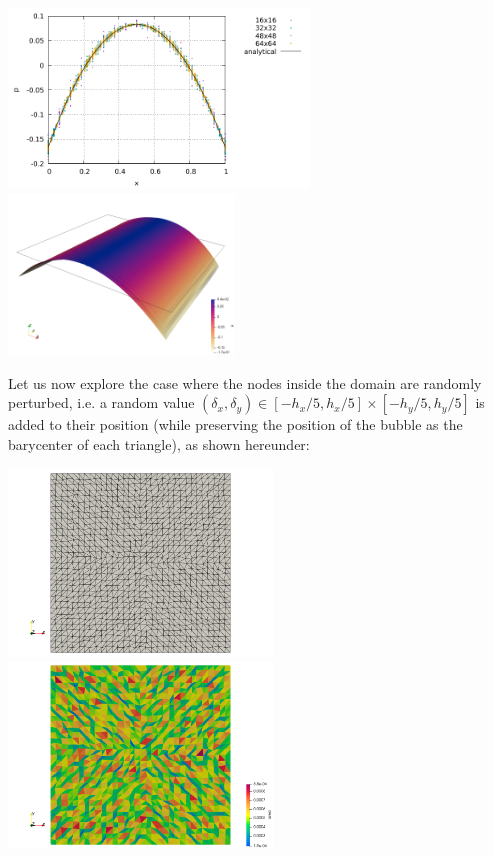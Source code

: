 \begin{center}
\includegraphics[width=8cm]{python_codes/fieldstone_47/results/reg/pressure.pdf}
\includegraphics[width=6cm]{python_codes/fieldstone_47/results/reg/press_64x64.png}
\end{center}


Let us now explore the case where the nodes inside the domain are randomly perturbed, i.e. 
a random value  $(\delta_x,\delta_y)\in[-h_x/5,h_x/5]\times[-h_y/5,h_y/5]$ is added 
to their position (while preserving the position of the bubble as the barycenter of each triangle), 
as shown hereunder:

\begin{center}
\includegraphics[width=7cm]{python_codes/fieldstone_47/results/rand/grid}
\includegraphics[width=7cm]{python_codes/fieldstone_47/results/rand/area}
\end{center}
 
